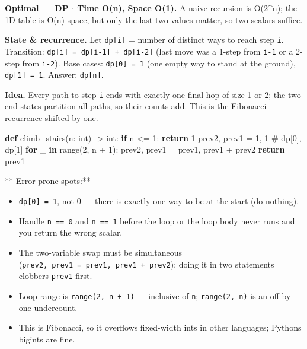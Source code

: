 \documentclass[11pt]{article}
\providecommand{\tightlist}{\setlength{\itemsep}{1pt}\setlength{\parskip}{0pt}}
\newenvironment{Shaded}{\begin{snugshade}}{\end{snugshade}}
\newcommand{\BuiltInTok}[1]{\textcolor[rgb]{0.50,0.55,0.55}{#1}}
\newcommand{\CommentTok}[1]{\textcolor[rgb]{0.48,0.49,0.49}{#1}}
\newcommand{\ControlFlowTok}[1]{\textcolor[rgb]{0.99,0.74,0.29}{\textbf{#1}}}
\newcommand{\DecValTok}[1]{\textcolor[rgb]{0.96,0.45,0.00}{#1}}
\newcommand{\KeywordTok}[1]{\textcolor[rgb]{0.81,0.81,0.76}{\textbf{#1}}}
\newcommand{\NormalTok}[1]{\textcolor[rgb]{0.81,0.81,0.76}{#1}}
\newcommand{\OperatorTok}[1]{\textcolor[rgb]{0.81,0.81,0.76}{#1}}
\begin{document}
\textbf{Optimal --- DP \(\cdot\) Time O(n), Space O(1).} A naive recursion is O(2\^{}n); the 1D table is O(n) space, but only the last two values matter, so two scalars suffice.

\textbf{State \& recurrence.} Let \texttt{dp{[}i{]}} = number of distinct ways to reach step \texttt{i}. Transition: \texttt{dp{[}i{]}\ =\ dp{[}i-1{]}\ +\ dp{[}i-2{]}} (last move was a 1-step from \texttt{i-1} or a 2-step from \texttt{i-2}). Base cases: \texttt{dp{[}0{]}\ =\ 1} (one empty way to stand at the ground), \texttt{dp{[}1{]}\ =\ 1}. Answer: \texttt{dp{[}n{]}}.

\textbf{Idea.} Every path to step \texttt{i} ends with exactly one final hop of size 1 or 2; the two end-states partition all paths, so their counts add. This is the Fibonacci recurrence shifted by one.


\begin{Shaded}
\begin{Highlighting}[]
\KeywordTok{def}\NormalTok{ climb\_stairs(n: }\BuiltInTok{int}\NormalTok{) }\OperatorTok{{-}\textgreater{}} \BuiltInTok{int}\NormalTok{:}
    \ControlFlowTok{if}\NormalTok{ n }\OperatorTok{\textless{}=} \DecValTok{1}\NormalTok{:}
        \ControlFlowTok{return} \DecValTok{1}
\NormalTok{    prev2, prev1 }\OperatorTok{=} \DecValTok{1}\NormalTok{, }\DecValTok{1}          \CommentTok{\# dp[0], dp[1]}
    \ControlFlowTok{for}\NormalTok{ \_ }\KeywordTok{in} \BuiltInTok{range}\NormalTok{(}\DecValTok{2}\NormalTok{, n }\OperatorTok{+} \DecValTok{1}\NormalTok{):}
\NormalTok{        prev2, prev1 }\OperatorTok{=}\NormalTok{ prev1, prev1 }\OperatorTok{+}\NormalTok{ prev2}
    \ControlFlowTok{return}\NormalTok{ prev1}
\end{Highlighting}
\end{Shaded}

** Error-prone spots:**

\begin{itemize}
\tightlist
\item
  \texttt{dp{[}0{]}\ =\ 1}, not 0 --- there is exactly one way to be at the start (do nothing).
\item
  Handle \texttt{n\ ==\ 0} and \texttt{n\ ==\ 1} before the loop or the loop body never runs and you return the wrong scalar.
\item
  The two-variable swap must be simultaneous (\texttt{prev2,\ prev1\ =\ prev1,\ prev1\ +\ prev2}); doing it in two statements clobbers \texttt{prev1} first.
\item
  Loop range is \texttt{range(2,\ n\ +\ 1)} --- inclusive of \texttt{n}; \texttt{range(2,\ n)} is an off-by-one undercount.
\item
  This is Fibonacci, so it overflows fixed-width ints in other languages; Python\textquotesingle s bigints are fine.
\end{itemize}
\end{document}
